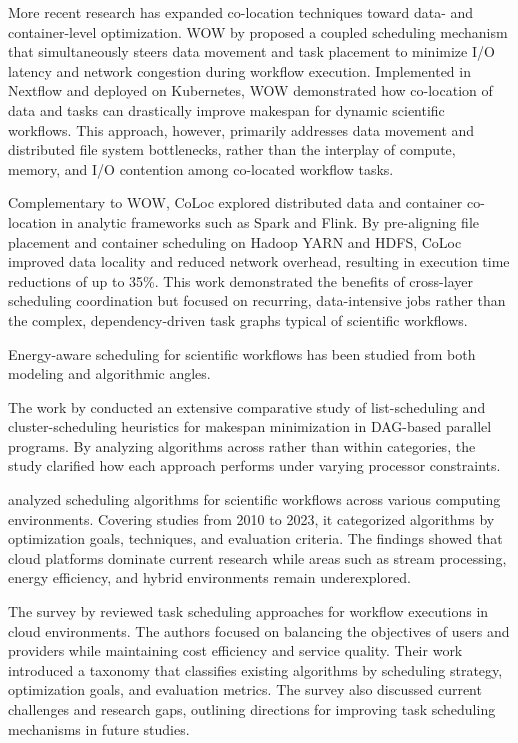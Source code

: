 More recent research has expanded co-location techniques toward data- and container-level optimization. WOW by \cite{11044799} proposed a coupled scheduling mechanism that simultaneously steers data movement and task placement to minimize I/O latency and network congestion during workflow execution. Implemented in Nextflow and deployed on Kubernetes, WOW demonstrated how co-location of data and tasks can drastically improve makespan for dynamic scientific workflows. This approach, however, primarily addresses data movement and distributed file system bottlenecks, rather than the interplay of compute, memory, and I/O contention among co-located workflow tasks.

Complementary to WOW, CoLoc \cite{7840954} explored distributed data and container co-location in analytic frameworks such as Spark and Flink. By pre-aligning file placement and container scheduling on Hadoop YARN and HDFS, CoLoc improved data locality and reduced network overhead, resulting in execution time reductions of up to 35\%. This work demonstrated the benefits of cross-layer scheduling coordination but focused on recurring, data-intensive jobs rather than the complex, dependency-driven task graphs typical of scientific workflows.

Energy-aware scheduling for scientific workflows has been studied from both modeling and algorithmic angles.

The work by \cite{8301529} conducted an extensive comparative study of list-scheduling and cluster-scheduling heuristics for makespan minimization in DAG-based parallel programs. By analyzing algorithms across rather than within categories, the study clarified how each approach performs under varying processor constraints.

\cite{10771770} analyzed scheduling algorithms for scientific workflows across various computing environments. Covering studies from 2010 to 2023, it categorized algorithms by optimization goals, techniques, and evaluation criteria. The findings showed that cloud platforms dominate current research while areas such as stream processing, energy efficiency, and hybrid environments remain underexplored.

The survey by \cite{HosseiniShirvani2024} reviewed task scheduling approaches for workflow executions in cloud environments. The authors focused on balancing the objectives of users and providers while maintaining cost efficiency and service quality. Their work introduced a taxonomy that classifies existing algorithms by scheduling strategy, optimization goals, and evaluation metrics. The survey also discussed current challenges and research gaps, outlining directions for improving task scheduling mechanisms in future studies.

